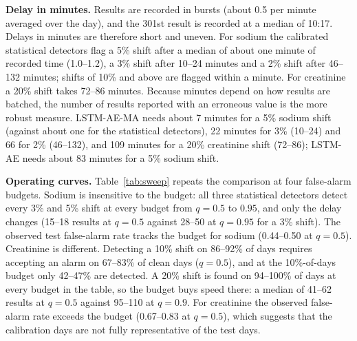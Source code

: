 \documentclass[conference]{IEEEtran}
\begin{document}
\textbf{Delay in minutes.} Results are recorded in bursts (about 0.5 per minute averaged over the day), and the 301st result is recorded at a median of 10:17. Delays in minutes are therefore short and uneven. For sodium the calibrated statistical detectors flag a 5\% shift after a median of about one minute of recorded time (1.0--1.2), a 3\% shift after 10--24 minutes and a 2\% shift after 46--132 minutes; shifts of 10\% and above are flagged within a minute. For creatinine a 20\% shift takes 72--86 minutes. Because minutes depend on how results are batched, the number of results reported with an erroneous value is the more robust measure. LSTM-AE-MA needs about 7 minutes for a 5\% sodium shift (against about one for the statistical detectors), 22 minutes for 3\% (10--24) and 66 for 2\% (46--132), and 109 minutes for a 20\% creatinine shift (72--86); LSTM-AE needs about 83 minutes for a 5\% sodium shift.

\textbf{Operating curves.} Table~\ref{tab:sweep} repeats the comparison at four false-alarm budgets. Sodium is insensitive to the budget: all three statistical detectors detect every 3\% and 5\% shift at every budget from $q=0.5$ to $0.95$, and only the delay changes (15--18 results at $q=0.5$ against 28--50 at $q=0.95$ for a 3\% shift). The observed test false-alarm rate tracks the budget for sodium (0.44--0.50 at $q=0.5$). Creatinine is different. Detecting a 10\% shift on 86--92\% of days requires accepting an alarm on 67--83\% of clean days ($q=0.5$), and at the 10\%-of-days budget only 42--47\% are detected. A 20\% shift is found on 94--100\% of days at every budget in the table, so the budget buys speed there: a median of 41--62 results at $q=0.5$ against 95--110 at $q=0.9$. For creatinine the observed false-alarm rate exceeds the budget (0.67--0.83 at $q=0.5$), which suggests that the calibration days are not fully representative of the test days.
\end{document}
